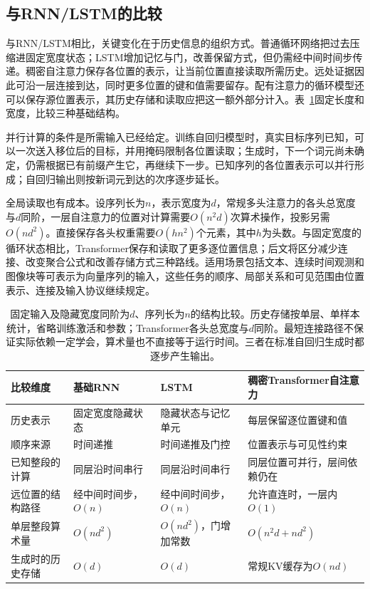 \subsection{与RNN/LSTM的比较}
\label{sec:transformer-recurrent-comparison}

与RNN/LSTM相比，关键变化在于历史信息的组织方式。普通循环网络把过去压缩进固定宽度状态；LSTM增加记忆与门，改善保留方式，但仍需经中间时间步传递。稠密自注意力保存各位置的表示，让当前位置直接读取所需历史。远处证据因此可沿一层连接到达，同时更多位置的键和值需要留存。配有注意力的循环模型还可以保存源位置表示，其历史存储和读取应把这一额外部分计入。表~\ref{tab:transformer-rnn-comparison}固定长度和宽度，比较三种基础结构。

并行计算的条件是所需输入已经给定。训练自回归模型时，真实目标序列已知，可以一次送入移位后的目标，并用掩码限制各位置读取；生成时，下一个词元尚未确定，仍需根据已有前缀产生它，再继续下一步。已知序列的各位置表示可以并行形成；自回归输出则按新词元到达的次序逐步延长。

全局读取也有成本。设序列长为$n$，表示宽度为$d$，常规多头注意力的各头总宽度与$d$同阶，一层自注意力的位置对计算需要$O(n^2d)$次算术操作，投影另需$O(nd^2)$。直接保存各头权重需要$O(hn^2)$个元素，其中$h$为头数。与固定宽度的循环状态相比，Transformer保存和读取了更多逐位置信息；后文将区分减少连接、改变聚合公式和改善存储方式三种路线。适用场景包括文本、连续时间观测和图像块等可表示为向量序列的输入，这些任务的顺序、局部关系和可见范围由位置表示、连接及输入协议继续规定。

\begin{table}[htbp]
  \centering
  \small
  \begin{tabular}{@{}p{28mm}p{39mm}p{40mm}p{48mm}@{}}
    \toprule
    比较维度 & 基础RNN & LSTM & 稠密Transformer自注意力 \\
    \midrule
    历史表示 & 固定宽度隐藏状态 & 隐藏状态与记忆单元 & 每层保留逐位置键和值 \\
    顺序来源 & 时间递推 & 时间递推及门控 & 位置表示与可见性约束 \\
    已知整段的计算 & 同层沿时间串行 & 同层沿时间串行 & 同层位置可并行，层间依赖仍在 \\
    远位置的结构路径 & 经中间时间步，$O(n)$ & 经中间时间步，$O(n)$ & 允许直连时，一层内$O(1)$ \\
    单层整段算术量 & $O(nd^2)$ & $O(nd^2)$，门增加常数 & $O(n^2d+nd^2)$ \\
    生成时的历史存储 & $O(d)$ & $O(d)$ & 常规KV缓存为$O(nd)$ \\
    \bottomrule
  \end{tabular}
  \caption{固定输入及隐藏宽度同阶为$d$、序列长为$n$的结构比较。历史存储按单层、单样本统计，省略训练激活和参数；Transformer各头总宽度与$d$同阶。最短连接路径不保证实际依赖一定学会，算术量也不直接等于运行时间。三者在标准自回归生成时都逐步产生输出。}
  \label{tab:transformer-rnn-comparison}
\end{table}
\FloatBarrier

